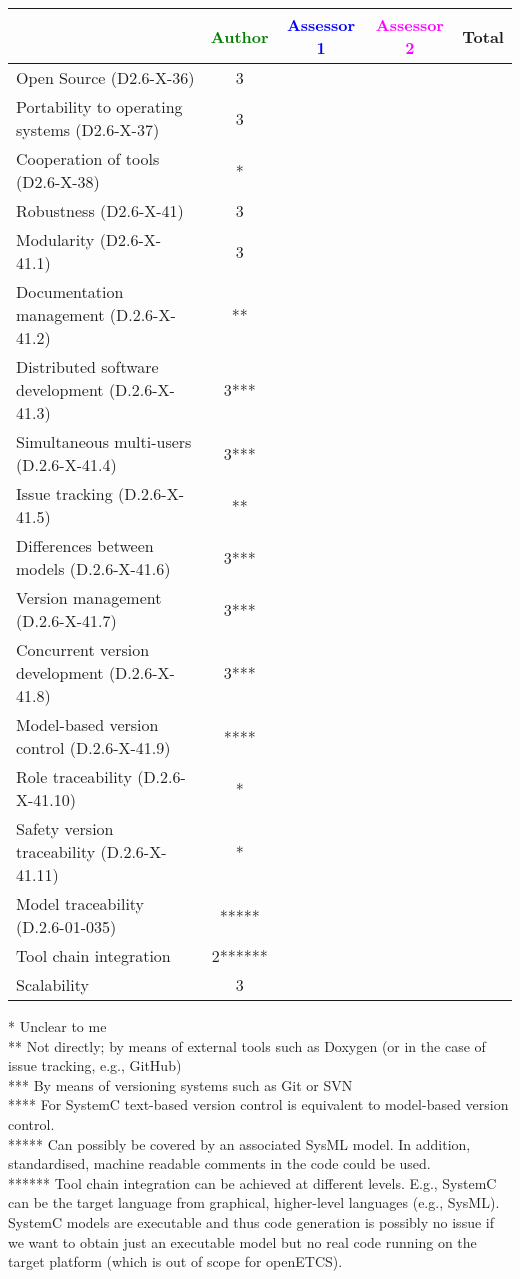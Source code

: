 \begin{tabular}{|l | c | c | c | c|}
\hline
& \textcolor{green}{Author} & \textcolor{blue}{Assessor 1} & \textcolor{magenta}{Assessor 2} & Total \\
\hline
Open Source (D2.6-X-36) &3 & & & \\
\hline
Portability to operating systems (D2.6-X-37) &3 & & & \\
\hline
Cooperation of tools (D2.6-X-38) &* & & & \\
\hline
Robustness (D2.6-X-41) &3 & & & \\
\hline
Modularity (D2.6-X-41.1) &3 & & & \\
\hline
Documentation management (D.2.6-X-41.2) &** & & & \\
\hline
Distributed software development (D.2.6-X-41.3) &3*** & & & \\
\hline
Simultaneous multi-users (D.2.6-X-41.4) &3*** & & & \\
\hline
Issue tracking (D.2.6-X-41.5) &** & & & \\
\hline
Differences between models (D.2.6-X-41.6) &3*** & & & \\
\hline
Version management (D.2.6-X-41.7) &3*** & & & \\
\hline
Concurrent version development (D.2.6-X-41.8) &3*** & & & \\
\hline
Model-based version control (D.2.6-X-41.9) &**** & & & \\
\hline
Role traceability (D.2.6-X-41.10) &* & & & \\
\hline
Safety version traceability (D.2.6-X-41.11) &* & & & \\
\hline
Model traceability (D.2.6-01-035) &***** & & & \\
\hline
Tool chain integration &2****** & & & \\
\hline
Scalability &3 & & & \\
\hline
\end{tabular}

\begin{author_comment}
  * Unclear to me\\
  ** Not directly; by means of external tools such as Doxygen (or in the case of issue tracking, e.g., GitHub)\\
 *** By means of versioning systems such as Git or SVN\\
**** For SystemC text-based version control is equivalent to model-based version control.\\
***** Can possibly be covered by an associated SysML model. In addition, standardised, machine readable comments in the code could be used.\\
****** Tool chain integration can be achieved at different levels. E.g., SystemC can be the target language from graphical, higher-level languages (e.g., SysML). SystemC models are executable and thus code generation is possibly no issue if we want to obtain just an executable model but no real code running on the target platform (which is out of scope for openETCS).
\end{author_comment}

